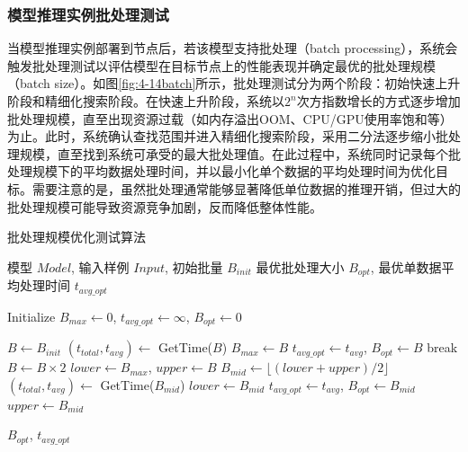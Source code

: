 \subsubsection{模型推理实例批处理测试}

当模型推理实例部署到节点后，若该模型支持批处理（batch processing），系统会触发批处理测试以评估模型在目标节点上的性能表现并确定最优的批处理规模（batch size）。如图\ref{fig:4-14batch}所示，批处理测试分为两个阶段：初始快速上升阶段和精细化搜索阶段。在快速上升阶段，系统以$2^n$次方指数增长的方式逐步增加批处理规模，直至出现资源过载（如内存溢出OOM、CPU/GPU使用率饱和等）为止。此时，系统确认查找范围并进入精细化搜索阶段，采用二分法逐步缩小批处理规模，直至找到系统可承受的最大批处理值。在此过程中，系统同时记录每个批处理规模下的平均数据处理时间，并以最小化单个数据的平均处理时间为优化目标。需要注意的是，虽然批处理通常能够显著降低单位数据的推理开销，但过大的批处理规模可能导致资源竞争加剧，反而降低整体性能。

\begin{algorithm}[ht]
\caption{批处理规模优化测试算法}
\label{alg:batch_size_optimization_simple}
\begin{algorithmic}[1]
\REQUIRE 模型 $Model$, 输入样例 $Input$, 初始批量 $B_{init}$
\ENSURE 最优批处理大小 $B_{opt}$, 最优单数据平均处理时间 $t_{avg\_opt}$

\STATE Initialize $B_{max} \leftarrow 0$, $t_{avg\_opt} \leftarrow \infty$, $B_{opt} \leftarrow 0$

\STATE $B \leftarrow B_{init}$
  \STATE $(t_{total}, t_{avg}) \leftarrow$ GetTime($B$)
  \STATE $B_{max} \leftarrow B$
    \STATE $t_{avg\_opt} \leftarrow t_{avg}$, $B_{opt} \leftarrow B$
    \STATE break 
  \ENDIF
  \STATE $B \leftarrow B \times 2$ 
\ENDWHILE
\STATE $lower \leftarrow B_{max}$, $upper \leftarrow B$ 
  \STATE $B_{mid} \leftarrow \lfloor(lower + upper) / 2\rfloor$
    \STATE $(t_{total}, t_{avg}) \leftarrow$ GetTime($B_{mid}$)
    \STATE $lower \leftarrow B_{mid}$
      \STATE $t_{avg\_opt} \leftarrow t_{avg}$, $B_{opt} \leftarrow B_{mid}$
    \ENDIF
  \ELSE
    \STATE $upper \leftarrow B_{mid}$
  \ENDIF
\ENDWHILE

\RETURN $B_{opt}$, $t_{avg\_opt}$
\end{algorithmic}
\end{algorithm}

